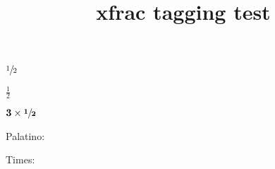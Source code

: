 \documentclass{article}
\title{xfrac tagging test}
\begin{document}

$\sfrac{1}{2}$

$\frac{1}{2}$

$\mathbf{3\times\sfrac{1}{2}}$

\selectfont Palatino: 

\selectfont Times: 
\end{document}
